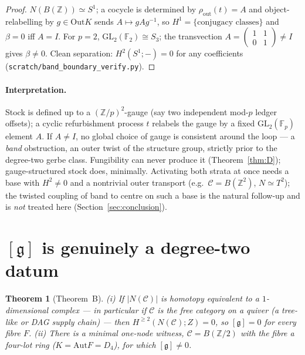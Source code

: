 \documentclass[11pt]{article}
\newtheorem{theorem}{Theorem}
\theoremstyle{definition}
\newcommand{\C}{\mathcal{C}}
\newcommand{\Z}{\mathbb{Z}}
\newcommand{\Aut}{\mathrm{Aut}}
\newcommand{\Out}{\mathrm{Out}}
\newcommand{\Zc}{Z}
\newcommand{\gerbe}{\mathfrak{g}}
\newcommand{\GL}{\mathrm{GL}}
\begin{document}
\begin{proof}
$N(B(\Z))\simeq S^1$; a cocycle is determined by $\rho_{\mathrm{out}}(t)=A$ and object-relabelling
by $g\in\Out K$ sends $A\mapsto gAg^{-1}$, so $H^1=\{\text{conjugacy classes}\}$ and $\beta=0$ iff
$A=I$. For $p=2$, $\GL_2(\mathbb F_2)\cong S_3$; the transvection
$A=\left(\begin{smallmatrix}1&1\\0&1\end{smallmatrix}\right)\ne I$ gives $\beta\ne0$. Clean
separation: $H^2(S^1;-)=0$ for any coefficients
(\texttt{scratch/band\_boundary\_verify.py}).
\end{proof}

\paragraph{Interpretation.}
Stock is defined up to a $(\Z/p)^2$-gauge (say two independent mod-$p$ ledger offsets); a cyclic
refurbishment process $t$ relabels the gauge by a fixed $\GL_2(\mathbb F_p)$ element $A$. If
$A\ne I$, no global choice of gauge is consistent around the loop --- a \emph{band} obstruction, an
outer twist of the structure group, strictly prior to the degree-two gerbe class. Fungibility can
never produce it (Theorem~\ref{thm:D}); gauge-structured stock does, minimally. Activating both
strata at once needs a base with $H^2\ne0$ and a nontrivial outer transport (e.g.\ $\C=B(\Z^2)$,
$N\simeq T^2$); the twisted coupling of band to centre on such a base is the natural follow-up and
is \emph{not} treated here (Section~\ref{sec:conclusion}).

\section{$[\gerbe]$ is genuinely a degree-two datum}\label{sec:B}

\begin{theorem}[Theorem~B]\label{thm:B}
\emph{(i)} If $|N(\C)|$ is homotopy equivalent to a $1$-dimensional complex --- in particular if
$\C$ is the free category on a quiver (a tree-like or DAG supply chain) --- then
$H^{\ge2}(N(\C);\Zc)=0$, so $[\gerbe]=0$ for every fibre $F$. \emph{(ii)} There is a minimal
one-node witness, $\C=B(\Z/2)$ with the fibre a four-lot ring ($K=\Aut F=D_4$), for which
$[\gerbe]\neq0$.
\end{theorem}
\end{document}
